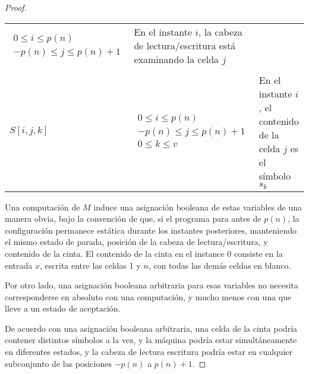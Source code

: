 \documentclass[11pt, a4paper]{memoir}
\begin{document}
\begin{proof}
\begin{table}[!ht]
\begin{center}
{\begin{tabular}{@{}C{.15\textwidth}C{.25\textwidth}L{.45\textwidth}@{}}
  \begin{minipage}{.24\textwidth} %
  \centering
    \begin{math} %
      \begin{array}{c} %
          0 \le i\le p(n) \\ %
          -p(n) \le j \le p(n) + 1 %
        \end{array}%
    \end{math} %
  \end{minipage} & En el instante $i$, la cabeza de lectura/escritura está examinando la celda $j$\\ \\ 
$S[i,j,k]$       & 

  \begin{minipage}{.24\textwidth} %
  \centering
    \begin{math} %
      \begin{array}{c} %
          0 \le i\le p(n) \\ %
           -p(n) \le j \le p(n) + 1 \\ %
           0 \le k \le v 
        \end{array}%
    \end{math} %
  \end{minipage} & En el instante $i$, el contenido de la celda $j$ es el símbolo $s_k$\\ 
\bottomrule
			\end{tabular}
		}
	\end{center}
\end{table}



Una computación de $M$ induce una asignación booleana de estas variables de una manera obvia, bajo la convención de que, si el programa para antes de $p(n)$, la configuración permanece estática durante los instantes posteriores, manteniendo el mismo estado de parada, posición de la cabeza de lectura/escritura, y contenido de la cinta. El contenido de la cinta en el instance 0 consiste en la entrada $x$, escrita entre las celdas 1 y $n$, con todas las demás celdas en blanco.

Por otro lado, una asignación booleana arbitraria para esas variables no necesita corresponderse en absoluto con una computación, y mucho menos con una que lleve a un estado de aceptación.

De acuerdo con una asignación booleana arbitraria, una celda de la cinta podría contener distintos símbolos a la vez, y la máquina podría estar simultáneamente en diferentes estados, y la cabeza de lectura escritura podría estar en cualquier subconjunto de las posiciones $-p(n)$ a $p(n) + 1$. 


\end{proof}
\end{document}
